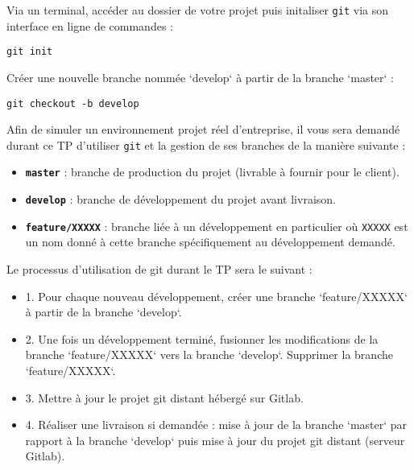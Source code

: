 \documentclass[11pt,a4paper,oneside]{article}
\begin{document}
Via un terminal, accéder au dossier de votre projet puis initaliser \texttt{git} via son interface en ligne de commandes :

\begin{lstlisting}[style=custombash]
 git init
\end{lstlisting}

Créer une nouvelle branche nommée `develop` à partir de la branche `master` :

\begin{lstlisting}[style=custombash]
 git checkout -b develop
\end{lstlisting}


\vspace{5mm}

Afin de simuler un environnement projet réel d'entreprise, il vous sera demandé durant ce TP d'utiliser \texttt{git} et la gestion de ses branches de la manière suivante :

\begin{itemize}
	\item \textbf{\texttt{master}} : branche de production du projet (livrable à fournir pour le client).
	\item \textbf{\texttt{develop}} : branche de développement du projet avant livraison.
	\item \textbf{\texttt{feature/XXXXX}} : branche liée à un développement en particulier où \texttt{XXXXX} est un nom donné à cette branche spécifiquement au développement demandé.
\end{itemize}

\vspace{5mm}

Le processus d'utilisation de git durant le TP sera le suivant : 

\begin{itemize}
	\item 1. Pour chaque nouveau développement, créer une branche `feature/XXXXX` à partir de la branche `develop`.
	\item 2. Une fois un développement terminé, fusionner les modifications de la branche `feature/XXXXX` vers la branche `develop`. Supprimer la branche `feature/XXXXX`.
	\item 3. Mettre à jour le projet git distant hébergé sur Gitlab.
	\item 4. Réaliser une livraison si demandée : mise à jour de la branche `master` par rapport à la branche `develop` puis mise à jour du projet git distant (serveur Gitlab).
\end{itemize}
\end{document}
